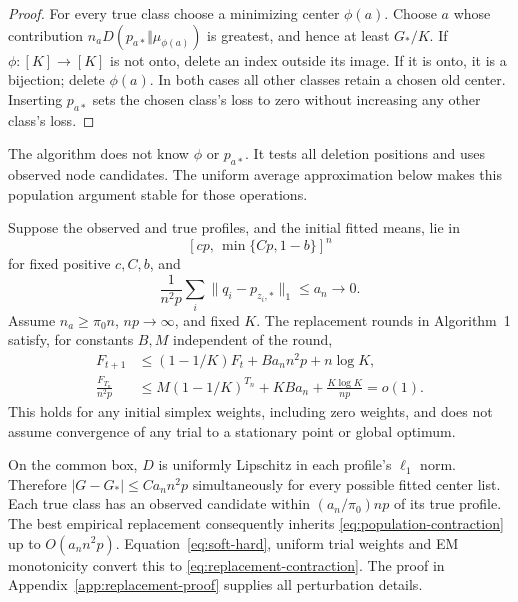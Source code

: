 \begin{proof}
For every true class choose a minimizing center $\phi(a)$. Choose $a$ whose contribution $n_aD(p_{a*}\Vert\mu_{\phi(a)})$ is greatest, and hence at least $G_*/K$. If $\phi:[K]\to[K]$ is not onto, delete an index outside its image. If it is onto, it is a bijection; delete $\phi(a)$. In both cases all other classes retain a chosen old center. Inserting $p_{a*}$ sets the chosen class's loss to zero without increasing any other class's loss.
\end{proof}

The algorithm does not know $\phi$ or $p_{a*}$. It tests all deletion positions and uses observed node candidates. The uniform average approximation below makes this population argument stable for those operations.

\begin{theorem}
\label{thm:replacement-contraction}
Suppose the observed and true profiles, and the initial fitted means, lie in
\[
 [c p,\,\min\{C p,1-b\}]^n
\]
for fixed positive $c,C,b$, and
\begin{equation}
 \frac1{n^2p}\sum_i\|q_i-p_{z_i,*}\|_1\le a_n\to0.
 \label{eq:replacement-input}
\end{equation}
Assume $n_a\ge\pi_0n$, $np\to\infty$, and fixed $K$. The replacement rounds in Algorithm~1 satisfy, for constants $B,M$ independent of the round,
\begin{align}
 F_{t+1}&\le (1-1/K)F_t+B a_n n^2p+n\log K,
 \label{eq:replacement-contraction}\\
 \frac{F_{T_n}}{n^2p}
 &\le M(1-1/K)^{T_n}+KB a_n+\frac{K\log K}{np}
   =o(1).
 \label{eq:replacement-weak-loss}
\end{align}
This holds for any initial simplex weights, including zero weights, and does not assume convergence of any trial to a stationary point or global optimum.
\end{theorem}

On the common box, $D$ is uniformly Lipschitz in each profile's $\ell_1$ norm. Therefore $|G-G_*|\le C a_n n^2p$ simultaneously for every possible fitted center list. Each true class has an observed candidate within $(a_n/\pi_0)np$ of its true profile. The best empirical replacement consequently inherits \eqref{eq:population-contraction} up to $O(a_n n^2p)$. Equation~\eqref{eq:soft-hard}, uniform trial weights and EM monotonicity convert this to \eqref{eq:replacement-contraction}. The proof in Appendix~\ref{app:replacement-proof} supplies all perturbation details.

